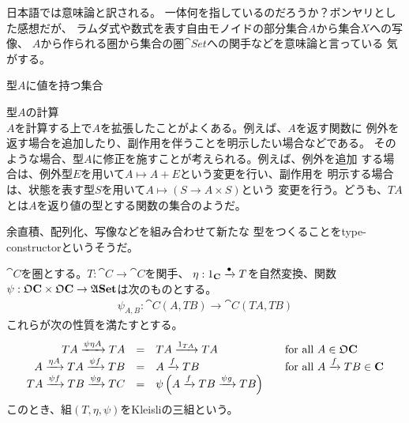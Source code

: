 {	\begin{description}\setlength{\itemsep}{-1mm} %
		\item[semantics] 日本語では意味論と訳される。
		一体何を指しているのだろうか？ボンヤリとした感想だが、
		ラムダ式や数式を表す自由モノイドの部分集合$A$から集合$X$への写像、
		$A$から作られる圏から集合の圏$\cat{Set}$への関手などを意味論と言っている
		気がする。
		\item[$A$] 型$A$に値を持つ集合
		\item[$TA$] 型$A$の計算 \\
		$A$を計算する上で$A$を拡張したことがよくある。例えば、$A$を返す関数に
		例外を返す場合を追加したり、副作用を伴うことを明示したい場合などである。
		そのような場合、型$A$に修正を施すことが考えられる。例えば、例外を追加
		する場合は、例外型$E$を用いて$A\mapsto A+E$という変更を行い、副作用を
		明示する場合は、状態を表す型$S$を用いて$A\mapsto(S\to A\times S)$という
		変更を行う。どうも、$TA$とは$A$を返り値の型とする関数の集合のようだ。
		\item[type-constructor] 余直積、配列化、写像などを組み合わせて新たな
		型をつくることをtype-constructorというそうだ\cite{haskell:wiki}。
	\end{description} %

	\begin{definition}[Kleisliの三組]\label{def:Kleisliの三組} %
		$\cat{C}$を圏とする。$T:\cat{C}\to\cat{C}$を関手、
		$\eta:1_{\mathbf{{C}}}\xrightarrow[{}]{\bullet}T$を自然変換、関数
		$\psi:\mathfrak{O}{\mathbf{{C}}}\times\mathfrak{O}{\mathbf{{C}}}\to\mathfrak{A}{\mathbf{{Set}}}$は次のものとする。
		\begin{equation*}\begin{split}
			\psi_{A,B} : \cat{C}(A,TB) \to \cat{C}(TA,TB)
		\end{split}\end{equation*}
		これらが次の性質を満たすとする。
		\begin{equation*}\begin{array}{rcll}
			TA\xrightarrow[{}]{\psi\eta A}TA &=& TA\xrightarrow[{}]{1_{TA}}TA 
			&\quad\text{for all } A\in\mathfrak{O}{\mathbf{{C}}} \\
			A\xrightarrow[{}]{\eta A}TA\xrightarrow[{}]{\psi f}TB &=& A\xrightarrow[{}]{f}TB 
			&\quad\text{for all } A\xrightarrow[{}]{f}TB\in{\ensuremath{\mathbf{{C}}}} \\
			TA\xrightarrow[{}]{\psi f}TB\xrightarrow[{}]{\psi g}TC &=& \psi\mathinner{\left({A\ensuremath{\xrightarrow[{}]{f}}TB\ensuremath{\xrightarrow[{}]{\psi g}}TB}\right)}
		\end{array}\end{equation*}
		このとき、組$(T,\eta,\psi)$をKleisliの三組という。\EOP
	\end{definition} %

}
